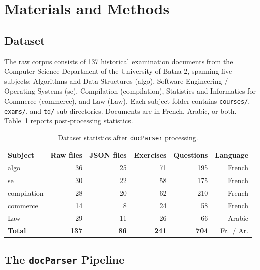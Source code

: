 \documentclass[12pt, a4paper]{article}
\begin{document}
\section{Materials and Methods}
\label{sec:methods}

\subsection{Dataset}
\label{subsec:dataset}

The raw corpus consists of 137 historical examination documents from the Computer
Science Department of the University of Batna 2, spanning five subjects:
Algorithms and Data Structures (algo), Software Engineering / Operating Systems (se),
Compilation (compilation), Statistics and Informatics for Commerce (commerce), and
Law (Law). Each subject folder contains \texttt{courses/}, \texttt{exams/}, and
\texttt{td/} sub-directories. Documents are in French, Arabic, or both.
Table~\ref{tab:dataset} reports post-processing statistics.

\begin{table}[H]
\centering
\caption{Dataset statistics after \texttt{docParser} processing.}
\label{tab:dataset}
\begin{tabular}{lrrrrr}
\toprule
\textbf{Subject} & \textbf{Raw files} & \textbf{JSON files} & \textbf{Exercises}
  & \textbf{Questions} & \textbf{Language} \\
\midrule
algo        & 36  & 25  & 71  & 195 & French \\
se          & 30  & 22  & 58  & 175 & French \\
compilation & 28  & 20  & 62  & 210 & French \\
commerce    & 14  &  8  & 24  &  58 & French \\
Law         & 29  & 11  & 26  &  66 & Arabic \\
\midrule
\textbf{Total} & \textbf{137} & \textbf{86} & \textbf{241} & \textbf{704}
  & Fr.~/ Ar. \\
\bottomrule
\end{tabular}
\end{table}

\subsection{The \texttt{docParser} Pipeline}
\label{subsec:docparser}
\end{document}
